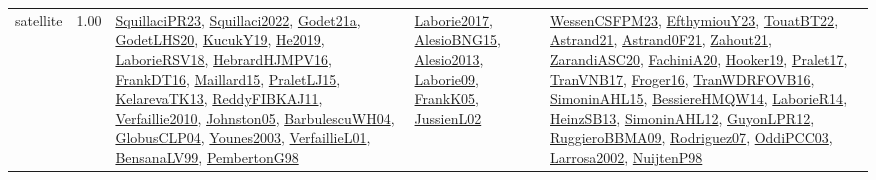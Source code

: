 {\begin{longtable}{p{3cm}r>{\raggedright\arraybackslash}p{6cm}>{\raggedright\arraybackslash}p{6cm}>{\raggedright\arraybackslash}p{8cm}}
\index{satellite}\index{ApplicationAreas!satellite}satellite &  1.00 & \hyperref[detail:SquillaciPR23]{SquillaciPR23}, \hyperref[detail:Squillaci2022]{Squillaci2022}, \hyperref[detail:Godet21a]{Godet21a}, \hyperref[detail:GodetLHS20]{GodetLHS20}, \hyperref[detail:KucukY19]{KucukY19}, \hyperref[detail:He2019]{He2019}, \hyperref[detail:LaborieRSV18]{LaborieRSV18}, \hyperref[detail:HebrardHJMPV16]{HebrardHJMPV16}, \hyperref[detail:FrankDT16]{FrankDT16}, \hyperref[detail:Maillard15]{Maillard15}, \hyperref[detail:PraletLJ15]{PraletLJ15}, \hyperref[detail:KelarevaTK13]{KelarevaTK13}, \hyperref[detail:ReddyFIBKAJ11]{ReddyFIBKAJ11}, \hyperref[detail:Verfaillie2010]{Verfaillie2010}, \hyperref[detail:Johnston05]{Johnston05}, \hyperref[detail:BarbulescuWH04]{BarbulescuWH04}, \hyperref[detail:GlobusCLP04]{GlobusCLP04}, \hyperref[detail:Younes2003]{Younes2003}, \hyperref[detail:VerfaillieL01]{VerfaillieL01}, \hyperref[detail:BensanaLV99]{BensanaLV99}, \hyperref[detail:PembertonG98]{PembertonG98} & \hyperref[detail:Laborie2017]{Laborie2017}, \hyperref[detail:AlesioBNG15]{AlesioBNG15}, \hyperref[detail:Alesio2013]{Alesio2013}, \hyperref[detail:Laborie09]{Laborie09}, \hyperref[detail:FrankK05]{FrankK05}, \hyperref[detail:JussienL02]{JussienL02} & \hyperref[detail:WessenCSFPM23]{WessenCSFPM23}, \hyperref[detail:EfthymiouY23]{EfthymiouY23}, \hyperref[detail:TouatBT22]{TouatBT22}, \hyperref[detail:Astrand21]{Astrand21}, \hyperref[detail:Astrand0F21]{Astrand0F21}, \hyperref[detail:Zahout21]{Zahout21}, \hyperref[detail:ZarandiASC20]{ZarandiASC20}, \hyperref[detail:FachiniA20]{FachiniA20}, \hyperref[detail:Hooker19]{Hooker19}, \hyperref[detail:Pralet17]{Pralet17}, \hyperref[detail:TranVNB17]{TranVNB17}, \hyperref[detail:Froger16]{Froger16}, \hyperref[detail:TranWDRFOVB16]{TranWDRFOVB16}, \hyperref[detail:SimoninAHL15]{SimoninAHL15}, \hyperref[detail:BessiereHMQW14]{BessiereHMQW14}, \hyperref[detail:LaborieR14]{LaborieR14}, \hyperref[detail:HeinzSB13]{HeinzSB13}, \hyperref[detail:SimoninAHL12]{SimoninAHL12}, \hyperref[detail:GuyonLPR12]{GuyonLPR12}, \hyperref[detail:RuggieroBBMA09]{RuggieroBBMA09}, \hyperref[detail:Rodriguez07]{Rodriguez07}, \hyperref[detail:OddiPCC03]{OddiPCC03}, \hyperref[detail:Larrosa2002]{Larrosa2002}, \hyperref[detail:NuijtenP98]{NuijtenP98}\\

\end{longtable}}

